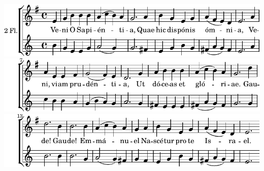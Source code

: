 \includegraphics{851a43e4cf0770cf058b44bb24480a64-1}%
\ifx\betweenLilyPondSystem \undefined
  \linebreak
\else
  \expandafter{}%
\fi
\includegraphics{851a43e4cf0770cf058b44bb24480a64-2}%
\ifx\betweenLilyPondSystem \undefined
  \linebreak
\else
  \expandafter{}%
\fi
\includegraphics{851a43e4cf0770cf058b44bb24480a64-3}%
